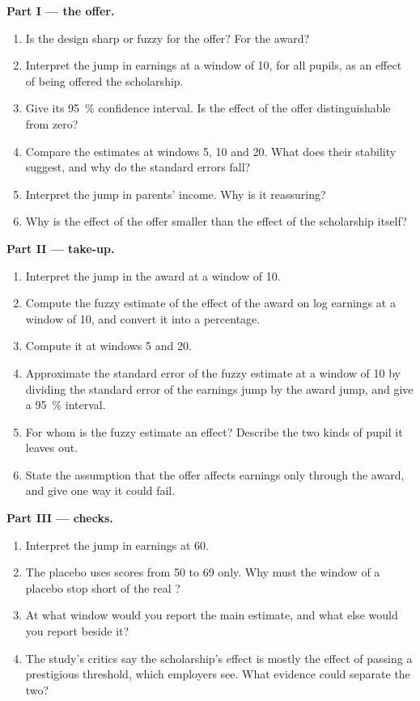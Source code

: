 \begin{problem}
\medskip\noindent\textbf{Part I --- the offer.}
\begin{enumerate}
\item Is the design sharp or fuzzy for the offer? For the award?
\item Interpret the jump in earnings at a window of 10, for all pupils, as an
effect of being offered the scholarship.
\item Give its 95~\% confidence interval. Is the effect of the offer
distinguishable from zero?
\item Compare the estimates at windows 5, 10 and 20. What does their stability
suggest, and why do the standard errors fall?
\item Interpret the jump in parents' income. Why is it reassuring?
\item Why is the effect of the offer smaller than the effect of the
scholarship itself?
\end{enumerate}

\medskip\noindent\textbf{Part II --- take-up.}
\begin{enumerate}[resume]
\item Interpret the jump in the award at a window of 10.
\item Compute the fuzzy estimate of the effect of the award on log earnings at
a window of 10, and convert it into a percentage.
\item Compute it at windows 5 and 20.
\item Approximate the standard error of the fuzzy estimate at a window of 10 by
dividing the standard error of the earnings jump by the award jump, and give a
95~\% interval.
\item For whom is the fuzzy estimate an effect? Describe the two kinds of pupil
it leaves out.
\item State the assumption that the offer affects earnings only through the
award, and give one way it could fail.
\end{enumerate}

\medskip\noindent\textbf{Part III --- checks.}
\begin{enumerate}[resume]
\item Interpret the jump in earnings at 60.
\item The placebo uses scores from 50 to 69 only. Why must the window of a
placebo  stop short of the real ?
\item At what window would you report the main estimate, and what else would
you report beside it?
\item The study's critics say the scholarship's effect is mostly the effect of
passing a prestigious threshold, which employers see. What evidence could
separate the two?
\end{enumerate}


\end{problem}
